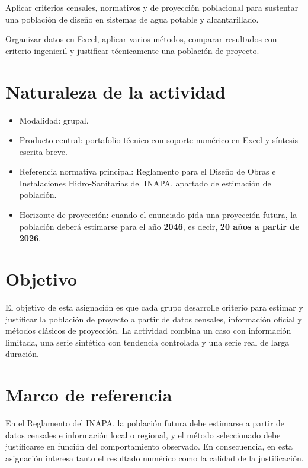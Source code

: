 \documentclass[11pt]{scrartcl}
\begin{document}
\icvmaketitle

\begin{icvnote}[Propósito]
Aplicar criterios censales, normativos y de proyección poblacional para
sustentar una población de diseño en sistemas de agua potable y
alcantarillado.
\end{icvnote}

\begin{icvnote}
Organizar datos en Excel, aplicar varios métodos, comparar resultados
con criterio ingenieril y justificar técnicamente una población de
proyecto.
\end{icvnote}

\section{Naturaleza de la actividad}
\begin{itemize}
  \item Modalidad: grupal.
  \item Producto central: portafolio técnico con soporte numérico en
    Excel y síntesis escrita breve.
  \item Referencia normativa principal: Reglamento para el Diseño de
    Obras e Instalaciones Hidro-Sanitarias del INAPA, apartado de
    estimación de población.
  \item Horizonte de proyección: cuando el enunciado pida una proyección
    futura, la población deberá estimarse para el año \textbf{2046},
    es decir, \textbf{20 años a partir de 2026}.
\end{itemize}

\section{Objetivo}
El objetivo de esta asignación es que cada grupo desarrolle criterio
para estimar y justificar la población de proyecto a partir de datos
censales, información oficial y métodos clásicos de proyección. La
actividad combina un caso con información limitada, una serie sintética
con tendencia controlada y una serie real de larga duración.

\section{Marco de referencia}
En el Reglamento del INAPA, la población futura debe estimarse a partir
de datos censales e información local o regional, y el método
seleccionado debe justificarse en función del comportamiento observado.
En consecuencia, en esta asignación interesa tanto el resultado numérico
como la calidad de la justificación.
\end{document}

